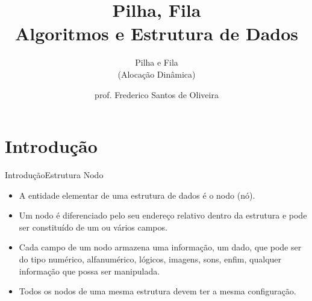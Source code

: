 \documentclass[aspectratio=169]{beamer}
\title[Aula Prática Pilha e Fila]{Pilha, Fila\\
   Algoritmos e Estrutura de Dados}
\subtitle{Pilha e Fila\\(Alocação Dinâmica)}
\author[Frederico Santos de Oliveira]{prof. Frederico Santos de Oliveira}
\institute[UFMT]{Universidade Federal de Mato Grosso\\ Instituto de Engenharia}
\date{}
\begin{document}
\begin{frame}[plain]
  \titlepage
\end{frame}



\section{Introdução}

\begin{frame}{Introdução}{Estrutura Nodo}
\begin{itemize}
 \item A  entidade elementar de uma estrutura de dados é o nodo (nó). 
 \item Um nodo é diferenciado pelo seu endereço relativo dentro da estrutura  e pode ser constituído de um ou vários campos. 
 \item Cada campo de um nodo armazena uma informação, um dado, que pode ser do tipo numérico, alfanumérico, lógicos, imagens, sons, enfim, qualquer informação que possa ser manipulada. 
 \item Todos os nodos de uma mesma estrutura devem ter a mesma configuração. 
\end{itemize}
\end{frame}

\end{document}
